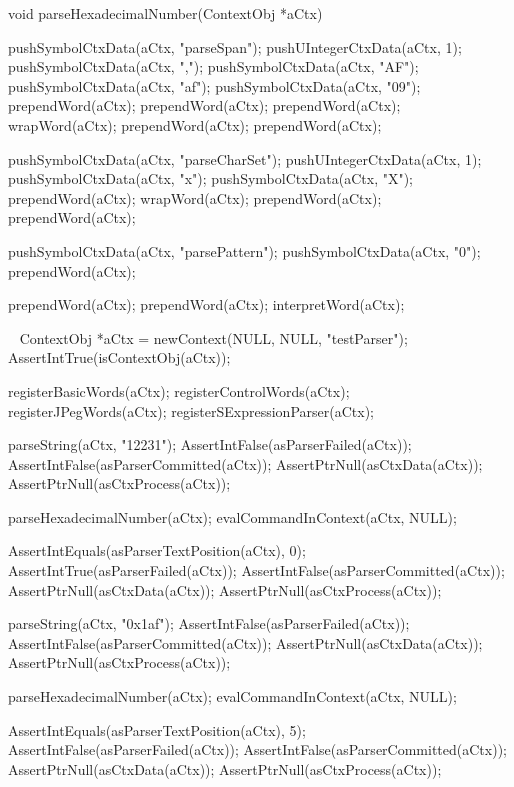 \startCCode
void parseHexadecimalNumber(ContextObj *aCtx) {

  pushSymbolCtxData(aCtx, "parseSpan");
  pushUIntegerCtxData(aCtx, 1);
  pushSymbolCtxData(aCtx, ",");
  pushSymbolCtxData(aCtx, "AF");
  pushSymbolCtxData(aCtx, "af");
  pushSymbolCtxData(aCtx, "09");
  prependWord(aCtx);
  prependWord(aCtx);
  prependWord(aCtx);
  wrapWord(aCtx);
  prependWord(aCtx);
  prependWord(aCtx);

  pushSymbolCtxData(aCtx, "parseCharSet");
  pushUIntegerCtxData(aCtx, 1);
  pushSymbolCtxData(aCtx, "x");
  pushSymbolCtxData(aCtx, "X");
  prependWord(aCtx);
  wrapWord(aCtx);
  prependWord(aCtx);
  prependWord(aCtx);

  pushSymbolCtxData(aCtx, "parsePattern");
  pushSymbolCtxData(aCtx, "0");
  prependWord(aCtx);
  
  prependWord(aCtx);  
  prependWord(aCtx);  
  interpretWord(aCtx);
}
\stopCCode

\CTestsSuiteSetup\
\startCTest
  ContextObj *aCtx = newContext(NULL, NULL, "testParser");
  AssertIntTrue(isContextObj(aCtx));
  
  registerBasicWords(aCtx);
  registerControlWords(aCtx);
  registerJPegWords(aCtx);
  registerSExpressionParser(aCtx);
\stopCTest

\startCTest
  parseString(aCtx, "12231");
  AssertIntFalse(asParserFailed(aCtx));
  AssertIntFalse(asParserCommitted(aCtx));
  AssertPtrNull(asCtxData(aCtx));
  AssertPtrNull(asCtxProcess(aCtx));
  
  parseHexadecimalNumber(aCtx);
  evalCommandInContext(aCtx, NULL);
  
  AssertIntEquals(asParserTextPosition(aCtx), 0);
  AssertIntTrue(asParserFailed(aCtx));
  AssertIntFalse(asParserCommitted(aCtx));
  AssertPtrNull(asCtxData(aCtx));
  AssertPtrNull(asCtxProcess(aCtx));
\stopCTest
\stopTestCase

\startCTest
  parseString(aCtx, "0x1af");
  AssertIntFalse(asParserFailed(aCtx));
  AssertIntFalse(asParserCommitted(aCtx));
  AssertPtrNull(asCtxData(aCtx));
  AssertPtrNull(asCtxProcess(aCtx));
  
  parseHexadecimalNumber(aCtx);
  evalCommandInContext(aCtx, NULL);
  
  AssertIntEquals(asParserTextPosition(aCtx), 5);
  AssertIntFalse(asParserFailed(aCtx));
  AssertIntFalse(asParserCommitted(aCtx));
  AssertPtrNull(asCtxData(aCtx));
  AssertPtrNull(asCtxProcess(aCtx));
\stopCTest
\stopTestCase
\stopTestSuite

